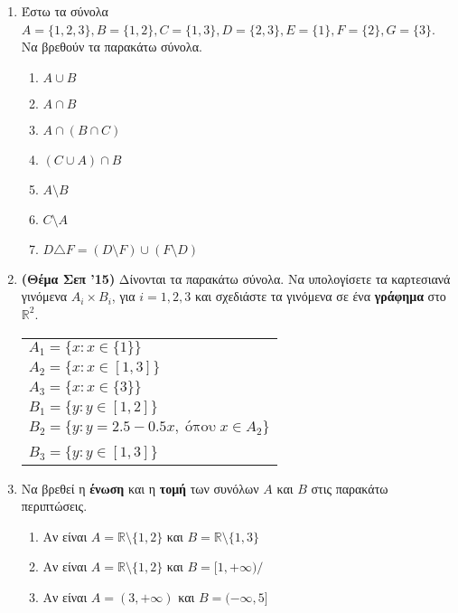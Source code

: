 


\pagestyle{vangelis}



\begin{center}
  \minibox{\large\bfseries \textcolor{Col1}{Ασκήσεις στα Σύνολα}}
\end{center}

\vspace{\baselineskip}

\begin{enumerate}


\item Έστω τα σύνολα $A=\{1,2,3\}, B=\{1,2\}, C=\{1,3\}, D=\{2,3\}, E=\{1\}, F=\{2\}, G=\{3\}$. Να βρεθούν τα παρακάτω σύνολα.
  \begin{enumerate}[label=(\roman*)]
\item $A\cup B$
\item $A\cap B$
\item $A\cap (B\cap C)$
\item $(C\cup A)\cap B$
\item $A\setminus B$
\item $C\setminus A$
\item $D\triangle F = (D\setminus F)\cup(F\setminus D)$
\end{enumerate}

\item {\bfseries(Θέμα Σεπ '15)} Δίνονται τα παρακάτω σύνολα. Να υπολογίσετε 
  τα καρτεσιανά γινόμενα $A_i\times B_i$, για $i=1,2,3$ και σχεδιάστε τα γινόμενα 
  σε ένα \textbf{γράφημα} στο $\mathbb{R}^2$.

\begin{tabular}{l}
$A_1=\{x:x\in\{1\}\}$\\
$A_2=\{x:x\in[1,3]\}$ \\
$A_3=\{x:x\in \{3\}\}$ \\
$B_1=\{y:y\in[1,2]\}$\\
$B_2=\{y:y=2.5-0.5x, \; \text{όπου} \; x \in A_{2}\}$ \\
$B_3=\{y:y\in[1,3]$\}
\end{tabular}

\item Να βρεθεί η \textbf{ένωση} και η \textbf{τομή} των συνόλων $A$ και $B$ στις 
  παρακάτω περιπτώσεις.
  \begin{enumerate}[(\roman*)]
\item Αν είναι $A=\mathbb{R}\setminus\{1,2\}$ και $B=\mathbb{R}\setminus\{1,3\}$
\item Αν είναι $A=\mathbb{R}\setminus\{1,2\}$ και $B=[1,+\infty)/$
\item Αν είναι $A=(3,+\infty)$ και $B=(-\infty,5]$
\end{enumerate}


\end{enumerate}

